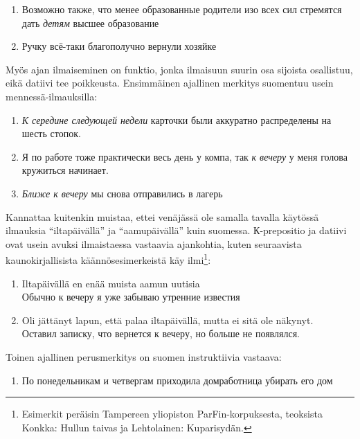 \documentclass[]{scrartcl}
\providecommand{\tightlist}{%
  \setlength{\itemsep}{0pt}\setlength{\parskip}{0pt}}
\begin{document}
\begin{enumerate}
\def\labelenumi{(\arabic{enumi})}
\setcounter{enumi}{77}
\tightlist
\item
  Возможно также, что менее образованные родители изо всех сил стремятся
  дать \emph{детям} высшее образование
\item
  Ручку всё-таки благополучно вернули хозяйке
\end{enumerate}

Myös ajan ilmaiseminen on funktio, jonka ilmaisuun suurin osa sijoista
osallistuu, eikä datiivi tee poikkeusta. Ensimmäinen ajallinen merkitys
suomentuu usein mennessä-ilmauksilla:

\begin{enumerate}
\def\labelenumi{(\arabic{enumi})}
\setcounter{enumi}{79}
\tightlist
\item
  \emph{К середине следующей недели} карточки были аккуратно
  распределены на шесть стопок.
\item
  Я по работе тоже практически весь день у компа, так \emph{к вечеру} у
  меня голова кружиться начинает.
\item
  \emph{Ближе к вечеру} мы снова отправились в лагерь
\end{enumerate}

Kannattaa kuitenkin muistaa, ettei venäjässä ole samalla tavalla
käytössä ilmauksia ``iltapäivällä'' ja ``aamupäivällä'' kuin suomessa.
К-prepositio ja datiivi ovat usein avuksi ilmaistaessa vastaavia
ajankohtia, kuten seuraavista kaunokirjallisista käännösesimerkeistä käy
ilmi\footnote{Esimerkit peräisin Tampereen yliopiston
  ParFin-korpuksesta, teoksista Konkka: Hullun taivas ja Lehtolainen:
  Kuparisydän.}:

\begin{enumerate}
\def\labelenumi{(\arabic{enumi})}
\setcounter{enumi}{82}
\tightlist
\item
  Iltapäivällä en enää muista aamun uutisia\\
   Обычно к вечеру я уже забываю утренние известия
\item
  Oli jättänyt lapun, että palaa iltapäivällä, mutta ei sitä ole
  näkynyt.\\
   Оставил записку, что вернется к вечеру, но больше не появлялся.
\end{enumerate}

Toinen ajallinen perusmerkitys on suomen instruktiivia vastaava:

\begin{enumerate}
\def\labelenumi{(\arabic{enumi})}
\setcounter{enumi}{84}
\tightlist
\item
  По понедельникам и четвергам приходила домработница убирать его дом
\end{enumerate}
\end{document}
